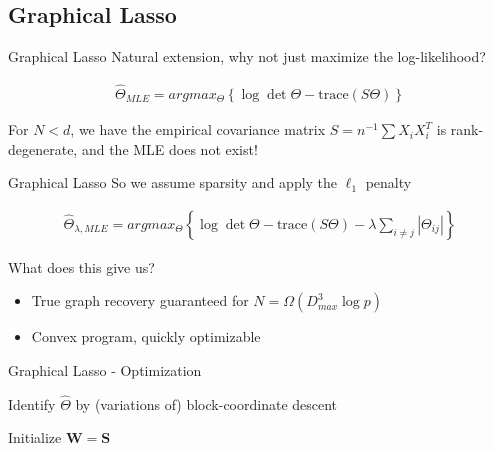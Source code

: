 \documentclass{beamer}
\begin{document}
\subsection{Graphical Lasso}

\begin{frame}{Graphical Lasso}
Natural extension, why not just maximize the log-likelihood?

\begin{gather*}
    \hat{\Theta}_{MLE}
    =
    argmax_\Theta
    \left\{
        \log \det \Theta - \text{trace}(S\Theta)
    \right\}
\end{gather*}

For $N<d$, we have the empirical covariance matrix $S = n^{-1}\sum X_i X_i^T$ is rank-degenerate, and the MLE does not exist!

\end{frame}



\begin{frame}{Graphical Lasso}
So we assume sparsity and apply the $\ell_1$ penalty

\begin{gather*}
    \hat{\Theta}_{\lambda, MLE}
    =
    argmax_\Theta
    \left\{
        \log \det \Theta - \text{trace}(S\Theta)
        -
        \lambda \sum_{i\neq j} |\Theta_{ij}|
    \right\}
\end{gather*}

What does this give us? 
\begin{itemize}
    \item True graph recovery guaranteed for $N=\Omega(D_{max}^3\log p)$
    \item Convex program, quickly optimizable 
\end{itemize}
\end{frame}

\begin{frame}{Graphical Lasso - Optimization}

Identify $\hat\Theta$ by (variations of) block-coordinate descent

\begin{algorithmic}[1]
    \State Initialize $\mathbf{W} = \mathbf{S}$
\end{algorithmic}   

\end{frame}
\end{document}
